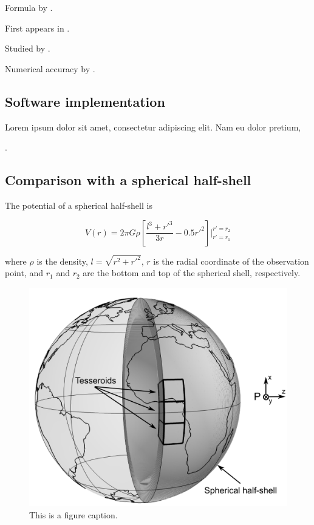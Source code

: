 \documentclass[paper,twocolumn,twoside]{geophysics}
\begin{document}
Formula by \citet{Grombein2013}.

First appears in \citet{Asgharzadeh2007}.

Studied by \citet{Wild-Pfeiffer2008}.

Numerical accuracy by \citet{Ku1977}.

\subsection{Software implementation}

Lorem ipsum dolor sit amet, consectetur adipiscing elit. Nam eu dolor pretium,

\citet{Barrera-Figueroa2006}.

\subsection{Comparison with a spherical half-shell}


The potential of a spherical half-shell is

\begin{equation}
    V(r) = 2\pi G \rho \left[ \dfrac{l^3 + {r'}^3}{3r} - 0.5 {r'}^2 \right]
           \Biggr \rvert_{r'=r_1}^{r'=r_2}
    \label{eq:halfshell-pot}
\end{equation}

\noindent
where $\rho$ is the density,
$l = \sqrt{r^2 + {r'}^2}$,
$r$ is the radial coordinate of the observation point,
and
$r_1$ and $r_2$ are the bottom and top of the spherical shell,
respectively.

\begin{figure}
    \centering
    \includegraphics[width=\columnwidth]{figs/spherical-shell.png}
    \caption{This is a figure caption.}
    \label{fig:shell}
\end{figure}
\end{document}
